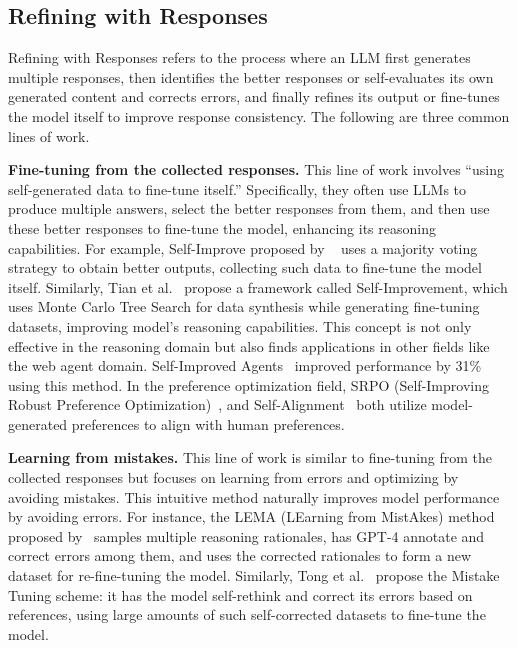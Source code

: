 \documentclass[lettersize,journal]{IEEEtran}
\begin{document}
\subsection{Refining with Responses} \label{sec:refining_with_responses}


\noindent Refining with Responses refers to the process where an LLM first generates multiple responses, then identifies the better responses or self-evaluates its own generated content and corrects errors, and finally refines its output or fine-tunes the model itself to improve response consistency. The following are three common lines of work.

\textbf{Fine-tuning from the collected responses.} This line of work involves ``using self-generated data to fine-tune itself.'' Specifically, they often use LLMs to produce multiple answers, select the better responses from them, and then use these better responses to fine-tune the model, enhancing its reasoning capabilities. For example, Self-Improve proposed by ~\cite{SelfImprove_23_EMNLP_Illinois} uses a majority voting strategy to obtain better outputs, collecting such data to fine-tune the model itself. Similarly, Tian et al.~\cite{SelfImprovement_24_arXiv_Tencent} propose a framework called Self-Improvement, which uses Monte Carlo Tree Search for data synthesis while generating fine-tuning datasets, improving model's reasoning capabilities. This concept is not only effective in the reasoning domain but also finds applications in other fields like the web agent domain. Self-Improved Agents~\cite{WebAgent_24_arXiv_UPenn} improved performance by 31\% using this method. In the preference optimization field, SRPO (Self-Improving Robust Preference Optimization)~\cite{SelfImprove_24_arXiv_Cohere}, and Self-Alignment~\cite{SelfAlignment_23_NeuIPS_CMU} both utilize model-generated preferences to align with human preferences.

\textbf{Learning from mistakes.} This line of work is similar to fine-tuning from the collected responses but focuses on learning from errors and optimizing by avoiding mistakes. This intuitive method naturally improves model performance by avoiding errors. For instance, the LEMA (LEarning from MistAkes) method proposed by~\cite{LearnMistake_24_arXiv_MS} samples multiple reasoning rationales, has GPT-4 annotate and correct errors among them, and uses the corrected rationales to form a new dataset for re-fine-tuning the model. Similarly, Tong et al.~\cite{LearnMistake_24_arXiv_UCSD} propose the Mistake Tuning scheme: it has the model self-rethink and correct its errors based on references, using large amounts of such self-corrected datasets to fine-tune the model.
\end{document}
